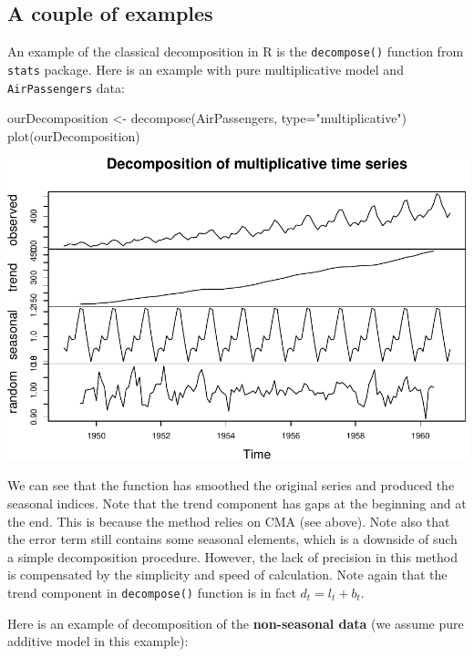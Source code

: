 \documentclass[
]{book}
\newenvironment{Shaded}{\begin{snugshade}}{\end{snugshade}}
\newcommand{\AttributeTok}[1]{\textcolor[rgb]{0.77,0.63,0.00}{#1}}
\newcommand{\FunctionTok}[1]{\textcolor[rgb]{0.00,0.00,0.00}{#1}}
\newcommand{\NormalTok}[1]{#1}
\newcommand{\OtherTok}[1]{\textcolor[rgb]{0.56,0.35,0.01}{#1}}
\newcommand{\StringTok}[1]{\textcolor[rgb]{0.31,0.60,0.02}{#1}}
\theoremstyle{definition}
\theoremstyle{definition}
\theoremstyle{definition}
\theoremstyle{definition}
\theoremstyle{remark}
\begin{document}
\hypertarget{a-couple-of-examples}{%
\subsection{A couple of examples}\label{a-couple-of-examples}}

An example of the classical decomposition in R is the \texttt{decompose()} function from \texttt{stats} package. Here is an example with pure multiplicative model and \texttt{AirPassengers} data:

\begin{Shaded}
\begin{Highlighting}[]
\NormalTok{ourDecomposition }\OtherTok{\textless{}{-}} \FunctionTok{decompose}\NormalTok{(AirPassengers,}
                              \AttributeTok{type=}\StringTok{"multiplicative"}\NormalTok{)}
\FunctionTok{plot}\NormalTok{(ourDecomposition)}
\end{Highlighting}
\end{Shaded}

\includegraphics{adam_files/figure-latex/decomposeAirPassengers-1.pdf}

We can see that the function has smoothed the original series and produced the seasonal indices. Note that the trend component has gaps at the beginning and at the end. This is because the method relies on CMA (see above). Note also that the error term still contains some seasonal elements, which is a downside of such a simple decomposition procedure. However, the lack of precision in this method is compensated by the simplicity and speed of calculation. Note again that the trend component in \texttt{decompose()} function is in fact \(d_t = l_{t}+b_{t}\).

Here is an example of decomposition of the \textbf{non-seasonal data} (we assume pure additive model in this example):
\end{document}
